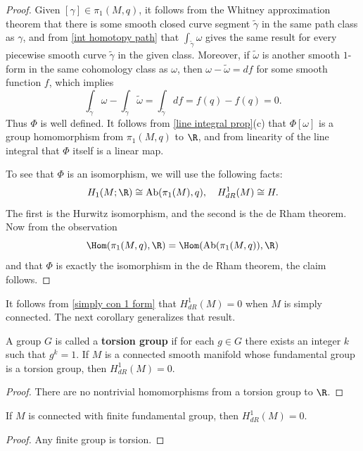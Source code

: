 \begin{proof}
Given $[\gamma]\in\pi_1(M,q)$, it follows from the Whitney approximation theorem that there is some smooth closed curve segment $\widetilde{\gamma}$ in the same path class as $\gamma$, and from \cref{int homotopy path} that $\int_{\widetilde{\gamma}}\omega$ gives the same result for every piecewise smooth curve $\widetilde{\gamma}$ in the given class. Moreover, if $\widetilde{\omega}$ is another smooth $1$-form in the same cohomology class as $\omega$, then $\omega-\widetilde{\omega}=df$ for some smooth function $f$, which implies
\[\int_{\widetilde{\gamma}}\omega-\int_{\widetilde{\gamma}}\widetilde{\omega}=\int_{\widetilde{\gamma}}df=f(q)-f(q)=0.\]
Thus $\varPhi$ is well defined. It follows from \cref{line integral prop}(c) that $\varPhi[\omega]$ is a group homomorphism from $\pi_1(M,q)$ to $\R$, and 
from linearity of the line integral that $\varPhi$ itself is a linear map.\par
To see that $\varPhi$ is an isomorphism, we will use the following facts:
\[H_1(M;\R)\cong\mathrm{Ab}(\pi_1(M),q),\quad H^1_{dR}(M)\cong H.\]
The first is the Hurwitz isomorphism, and the second is the de Rham theorem. Now from the observation
\[\Hom(\pi_1(M,q),\R)=\Hom(\mathrm{Ab}(\pi_1(M,q)),\R)\]
and that $\varPhi$ is exactly the isomorphism in the de Rham theorem, the claim follows.
\end{proof}
It follows from \cref{simply con 1 form} that $H^1_{dR}(M)=0$ when $M$ is simply connected. The next corollary generalizes that result.
\begin{proposition}
A group $G$ is called a \textbf{torsion group} if for each $g\in G$ there exists an integer $k$ such that $g^k=1$. If $M$ is a connected smooth manifold whose fundamental group is a torsion group, then $H^1_{dR}(M)=0$.
\end{proposition}
\begin{proof}
There are no nontrivial homomorphisms from a torsion group to $\R$.
\end{proof}
\begin{corollary}\label{cohomology fundamental finite}
If $M$ is connected with finite fundamental group, then $H^1_{dR}(M)=0$.
\end{corollary}
\begin{proof}
Any finite group is torsion.
\end{proof}
